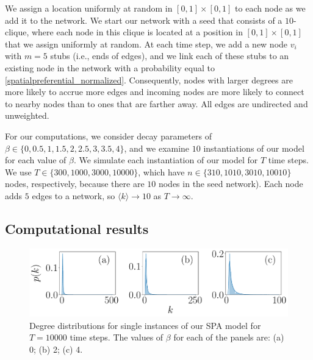 \documentclass[%
 reprint,
 amsmath,amssymb,
 aps,
]{revtex4-1}
\begin{document}
We assign a location uniformly at random in $[0, 1] \times [0, 1]$ to each node as we add it to the network. 
We start our network with a seed that consists of a $10$-clique, where each node in this clique is located at a position in $[0, 1] \times [0, 1]$ that we assign uniformly at random. At each time step, we add a new node $v_i$ with $m=5$ stubs (i.e., ends of edges), and we link each of these stubs to an existing node in the network with a probability equal to \eqref{spatialpreferential_normalized}.
Consequently, nodes with larger degrees are more likely to accrue more edges
and incoming nodes are more likely to connect to nearby nodes than to ones that are farther away. All edges are undirected and unweighted. 


For our computations, we consider decay parameters of $\beta \in \{ 0, 0.5, 1, 1.5, 2, 2.5, 3, 3.5, 4\}$, and we examine $10$ instantiations of our model for each value of $\beta$. We simulate each instantiation of our model for $T$ time steps. We use $T \in \{300, 1000, 3000, 10000\}$, which have $n \in \{310, 1010, 3010, 10010\}$ nodes, respectively, because there are $10$ nodes in the seed network). Each node adds $5$ edges to a network, so $\langle k \rangle \rightarrow 10$ as $T \rightarrow \infty$.


\subsection{Computational results}


\begin{figure}
    \centering
    \includegraphics[width=1.0\linewidth]{preferential_attachment_degree_distribution.pdf}
    \caption{Degree distributions for single instances of our SPA model for $T=10000$ time steps. The values of $\beta$ for each of the panels are: (a) 0; (b) 2; (c) 4.
    }
\end{figure}
\end{document}

